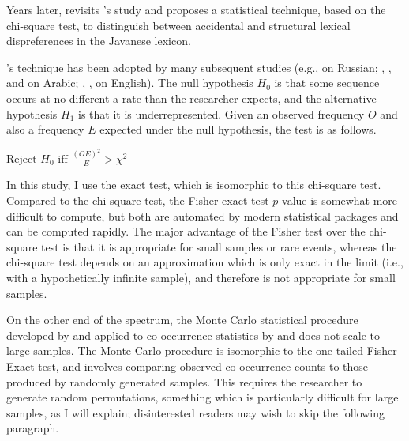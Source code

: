 \citet{McCarthy1988}

Years later, \citet{Mester1988} revisits \citeauthor{Uhlenbeck1950}'s study and proposes a statistical technique, based on the chi-square test, to distinguish between accidental and structural lexical dispreferences in the Javanese lexicon. 

\citeauthor{Mester1988}'s technique has been adopted by many subsequent studies (e.g., \citealt{Padgett1992,Padgett1995} on Russian; \citealt{Pierrehumbert1993}, \citealt{Frisch1996}, and \citealt{Frisch2004} on Arabic; \citealt{Berkley1994b,Berkley1994a,Berkley2000}, \citealt{Dmitrieva2008a}, \citealt{Dmitrieva2008b} on English). The null hypothesis $H_0$ is that some sequence occurs at no different a rate than the researcher expects, and the alternative hypothesis $H_1$ is that it is underrepresented. Given an observed frequency $O$ and also a frequency $E$ expected under the null hypothesis, the test is as follows.

\begin{example}
$\displaystyle \textrm{Reject } H_0 \textrm{ iff } \frac{(O E) ^ 2}{E} >
χ^2$
\end{example}

  
In this study, I use the \citet{Fisher1934} exact test, which is isomorphic to this chi-square test. Compared to the chi-square test, the Fisher exact test $p$-value is somewhat more difficult to compute, but both are automated by modern statistical packages and can be computed rapidly. The major advantage of the Fisher test over the chi-square test is that it is appropriate for small samples or rare events, whereas the chi-square test depends on an approximation which is only exact in the limit (i.e., with a hypothetically infinite sample), and therefore is not appropriate for small samples.

On the other end of the spectrum, the Monte Carlo statistical procedure developed by \citet{Kessler2001} and applied to co-occurrence statistics by \citet{Martin2007,Martin2011} and \citet{Brown2010} does not scale to large samples. The Monte Carlo procedure is isomorphic to the one-tailed Fisher Exact test, and involves comparing observed co-occurrence counts to those produced by randomly generated samples.  This requires the researcher to generate random permutations, something which is particularly difficult for large samples, as I will explain; disinterested readers may wish to skip the following paragraph.

